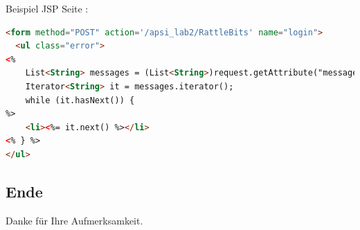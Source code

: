 \documentclass{beamer}
\begin{document}
\begin{frame}[fragile]
Beispiel JSP Seite :
\begin{lstlisting}[language=html]
  <form method="POST" action='/apsi_lab2/RattleBits' name="login">
  <ul class="error">
<%
    List<String> messages = (List<String>)request.getAttribute("messages");
	Iterator<String> it = messages.iterator();
    while (it.hasNext()) {
%>
	<li><%= it.next() %></li>
<% } %>
</ul>

\end{lstlisting}
\end{frame}



\begin{frame}
\section*{Ende}
 \huge Danke für Ihre Aufmerksamkeit.
\end{frame}
\end{document}
